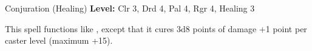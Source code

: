{Conjuration (Healing)}
{
	\textbf{Level:}
	Clr 3, Drd 4, Pal 4, Rgr 4, Healing 3\\
}
{
	This spell functions like , except that it cures 3d8 points of damage +1 point per caster level (maximum +15).

}
